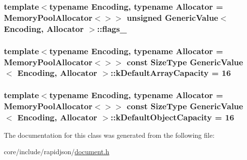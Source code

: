 \subsubsection[{\texorpdfstring{flags\+\_\+}{flags_}}]{\setlength{\rightskip}{0pt plus 5cm}template$<$typename Encoding, typename Allocator = Memory\+Pool\+Allocator$<$$>$$>$ unsigned {\bf Generic\+Value}$<$ Encoding, Allocator $>$\+::flags\+\_\+}\hypertarget{classGenericValue_ad0f9ce0bc0d1714678a77a2295da420c}{}\label{classGenericValue_ad0f9ce0bc0d1714678a77a2295da420c}
\subsubsection[{\texorpdfstring{k\+Default\+Array\+Capacity}{kDefaultArrayCapacity}}]{\setlength{\rightskip}{0pt plus 5cm}template$<$typename Encoding, typename Allocator = Memory\+Pool\+Allocator$<$$>$$>$ const {\bf Size\+Type} {\bf Generic\+Value}$<$ Encoding, Allocator $>$\+::k\+Default\+Array\+Capacity = 16\hspace{0.3cm}{\ttfamily [static]}}\hypertarget{classGenericValue_a188f57bdb1923c1fefe74baa995871a3}{}\label{classGenericValue_a188f57bdb1923c1fefe74baa995871a3}
\subsubsection[{\texorpdfstring{k\+Default\+Object\+Capacity}{kDefaultObjectCapacity}}]{\setlength{\rightskip}{0pt plus 5cm}template$<$typename Encoding, typename Allocator = Memory\+Pool\+Allocator$<$$>$$>$ const {\bf Size\+Type} {\bf Generic\+Value}$<$ Encoding, Allocator $>$\+::k\+Default\+Object\+Capacity = 16\hspace{0.3cm}{\ttfamily [static]}}\hypertarget{classGenericValue_a284d018914629aed9a4bd97fe2dc5899}{}\label{classGenericValue_a284d018914629aed9a4bd97fe2dc5899}


The documentation for this class was generated from the following file\+:\begin{DoxyCompactItemize}
\item 
core/include/rapidjson/\hyperlink{document_8h}{document.\+h}\end{DoxyCompactItemize}

